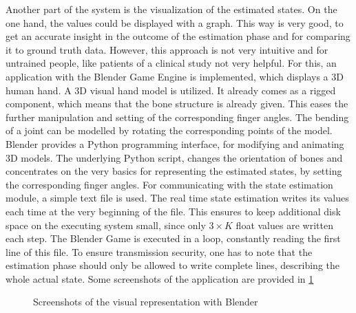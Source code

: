 Another part of the system is the visualization of the estimated states. On the one hand, the values could be displayed with a graph. This way is very good, to get an accurate insight in the outcome of the estimation phase and for comparing it to ground truth data. However, this approach is not very intuitive and for untrained people, like patients of a clinical study not very helpful. For this, an application with the Blender Game Engine \cite{blender} is implemented, which displays a 3D human hand. A 3D visual hand model is utilized. It already comes as a rigged component, which means that the bone structure is already given. This eases the further manipulation and setting of the corresponding finger angles. The bending of a joint can be modelled by rotating the corresponding points of the model. Blender provides a Python programming interface, for modifying and animating 3D models. The underlying Python script, changes the orientation of bones and concentrates on the very basics for representing the estimated states, by setting the corresponding finger angles. For communicating with the state estimation module, a simple text file is used. The real time state estimation writes its values each time at the very beginning of the file. This ensures to keep additional disk space on the executing system small, since only $ 3 \times K $ float values are written each step. The Blender Game is executed in a loop, constantly reading the first line of this file. To ensure transmission security, one has to note that the estimation phase should only be allowed to write complete lines, describing the whole actual state. Some screenshots of the application are provided in \ref{fig:blendGame}

\begin{figure}[h]
\centering
{}
\hfill
{}
\caption{Screenshots of the visual representation with Blender}
\label{fig:blendGame}
\end{figure}

\FloatBarrier
